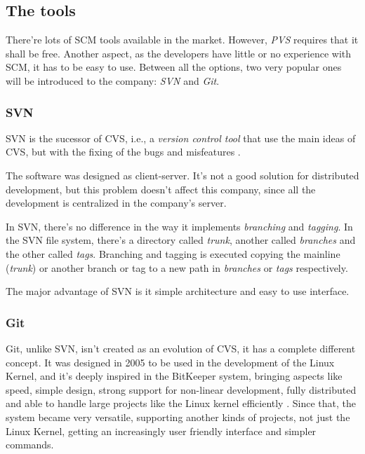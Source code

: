 \documentclass[a4paper]{article}
\begin{document}
\subsection{The tools}

There're lots of SCM tools available in the market. However, \emph{PVS} requires that it shall be free.
Another aspect, as the developers have little or no experience with SCM, it has to be easy to use.
Between all the options, two very popular ones will be introduced to the company: \emph{SVN} and \emph{Git}.

\subsubsection{SVN}

SVN is the sucessor of CVS, i.e., a \emph{version control tool} that use the main ideas of CVS, but with the fixing of the bugs and misfeatures \cite{collins-sussman}.

The software was designed as client-server.
It's not a good solution for distributed development, but this problem doesn't affect this company, since all the development is centralized in the company's server.

In SVN, there's no difference in the way it implements \emph{branching} and \emph{tagging}.
In the SVN file system, there's a directory called \emph{trunk}, another called \emph{branches} and the other called \emph{tags}.
Branching and tagging is executed copying the mainline (\emph{trunk}) or another branch or tag to a new path in \emph{branches} or \emph{tags} respectively.

The major advantage of SVN is it simple architecture and easy to use interface.

\subsubsection{Git}

Git, unlike SVN, isn't created as an evolution of CVS, it has a complete different concept.
It was designed in 2005 to be used in the development of the Linux Kernel, and it's deeply inspired in the BitKeeper system, bringing aspects like speed, simple design, strong support for non-linear development, fully distributed and able to handle large projects like the Linux kernel efficiently \cite{chacon}.
Since that, the system became very versatile, supporting another kinds of projects, not just the Linux Kernel, getting an increasingly user friendly interface and simpler commands.
\end{document}
